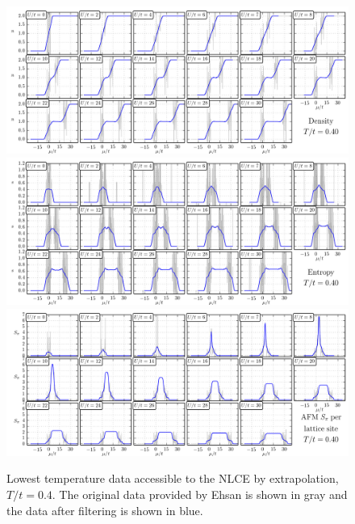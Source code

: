 \documentclass[11pt,letter]{article}
\begin{document}
\begin{figure}
    \centering
\includegraphics[width=1.0\textwidth]{../dataplots/NLCE_Final/density/T0_40.png}
\includegraphics[width=1.0\textwidth]{../dataplots/NLCE_Final/entropy/T0_40.png}
\includegraphics[width=1.0\textwidth]{../dataplots/NLCE_Final/spi/T0_40.png}
\caption{Lowest temperature data accessible to the NLCE by extrapolation,
$T/t=0.4$.  The original data provided by Ehsan is shown in gray and the data
after filtering is shown in blue.}
\label{fig:NLCE_T0.40}
\end{figure}
\end{document}
